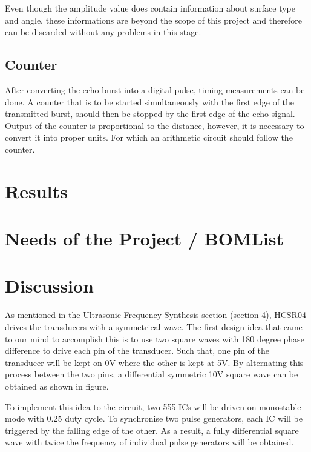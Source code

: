 \documentclass[12pt, a4paper]{article}
\begin{document}
	Even though the amplitude value does contain information about surface type and angle, these informations are beyond the scope of this project and therefore can be discarded without any problems in this stage.
	
	\subsection{Counter}
	
    After converting the echo burst into a digital pulse, timing measurements can be done. A counter that is to be started simultaneously with the first edge of the transmitted burst, should then be stopped by the first edge of the echo signal. Output of the counter is proportional to the distance, however, it is necessary to convert it into proper units. For which an arithmetic circuit should follow the counter.
	
	    
   \pagebreak

    \section{Results}
    
    
        \pagebreak
            
    \section{Needs of the Project / BOMList}

      
    \pagebreak
     \section{Discussion}
    
    As mentioned in the Ultrasonic Frequency Synthesis section (section 4), HCSR04 drives the transducers with a symmetrical wave. The first design idea that came to our mind to accomplish this is to use  two square waves with 180 degree phase difference to drive each pin of the transducer. Such that, one pin of the transducer will be kept on 0V where the other is kept at 5V. By alternating this process between the two pins, a differential symmetric 10V square wave can be obtained as shown in figure.
     
     To implement this idea to the circuit, two 555 ICs will be driven on monostable mode with 0.25 duty cycle. To synchronise two pulse generators, each IC will be triggered by the falling edge of the other. As a result, a fully differential square wave with twice the frequency of individual pulse generators will be obtained.
     
\end{document}
